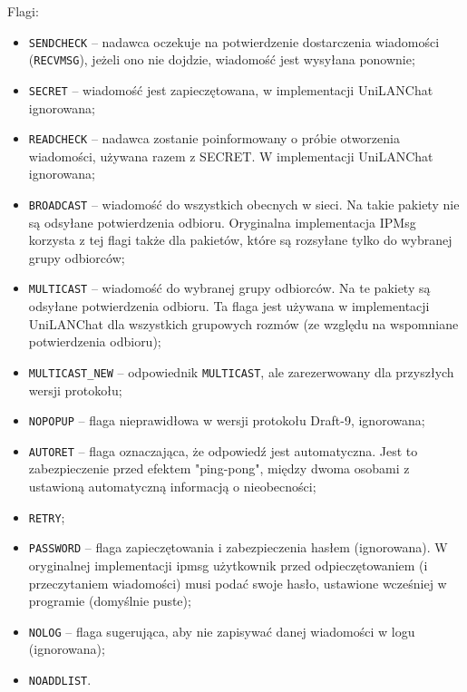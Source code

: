 \documentclass[11pt,leqno]{article}
\begin{document}
Flagi:
\begin{itemize}
	\item \texttt{SENDCHECK} -- nadawca oczekuje na potwierdzenie dostarczenia wiadomości
	(\texttt{RECVMSG}), jeżeli ono nie dojdzie, wiadomość jest wysyłana ponownie;
	\item \texttt{SECRET} -- wiadomość jest zapieczętowana, w implementacji UniLANChat ignorowana;
	\item \texttt{READCHECK} -- nadawca zostanie poinformowany o próbie otworzenia wiadomości,
	używana razem z SECRET. W implementacji UniLANChat ignorowana;
	\item \texttt{BROADCAST} -- wiadomość do wszystkich obecnych w sieci. Na takie pakiety nie są
	odsyłane potwierdzenia odbioru. Oryginalna implementacja IPMsg korzysta z tej flagi także dla
	pakietów, które są rozsyłane tylko do wybranej grupy odbiorców;
	\item \texttt{MULTICAST} -- wiadomość do wybranej grupy odbiorców. Na te pakiety są odsyłane
	potwierdzenia odbioru. Ta flaga jest używana w implementacji UniLANChat dla wszystkich grupowych
	rozmów (ze względu na wspomniane potwierdzenia odbioru);
	\item \texttt{MULTICAST\_NEW} -- odpowiednik \texttt{MULTICAST}, ale zarezerwowany dla przyszłych
	wersji protokołu;
	\item \texttt{NOPOPUP} -- flaga nieprawidłowa w wersji protokołu Draft-9, ignorowana;
	\item \texttt{AUTORET} -- flaga oznaczająca, że odpowiedź jest automatyczna. Jest to
	zabezpieczenie przed efektem "ping-pong", między dwoma osobami z ustawioną automatyczną
	informacją o nieobecności;
	\item \texttt{RETRY};
	\item \texttt{PASSWORD} -- flaga zapieczętowania i zabezpieczenia hasłem (ignorowana).
	W oryginalnej implementacji ipmsg użytkownik przed odpieczętowaniem (i przeczytaniem
	wiadomości) musi podać swoje hasło, ustawione wcześniej w programie (domyślnie puste);
	\item \texttt{NOLOG} -- flaga sugerująca, aby nie zapisywać danej wiadomości
	w logu (ignorowana);
	\item \texttt{NOADDLIST}.
\end{itemize}
\end{document}
